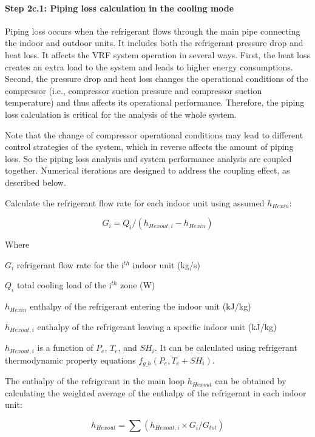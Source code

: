 \paragraph{Step 2c.1: Piping loss calculation in the cooling mode}\label{step-2c.1-piping-loss-calculation-in-the-cooling-mode}

Piping loss occurs when the refrigerant flows through the main pipe connecting the indoor and outdoor units. It includes both the refrigerant pressure drop and heat loss. It affects the VRF system operation in several ways. First, the heat loss creates an extra load to the system and leads to higher energy consumptions. Second, the pressure drop and heat loss changes the operational conditions of the compressor (i.e., compressor suction pressure and compressor suction temperature) and thus affects its operational performance. Therefore, the piping loss calculation is critical for the analysis of the whole system.

Note that the change of compressor operational conditions may lead to different control strategies of the system, which in reverse affects the amount of piping loss. So the piping loss analysis and system performance analysis are coupled together. Numerical iterations are designed to address the coupling effect, as described below.

Calculate the refrigerant flow rate for each indoor unit using assumed $h_{Hexin}$:

\begin{equation}
  G_i=Q_i/(h_{Hexout,i}-h_{Hexin})
\end{equation}

Where

$G_i$ refrigerant flow rate for the i\(^{th}\) indoor unit (kg/s) 

$Q_i$ total cooling load of the i\(^{th}\) zone (W) 

$h_{Hexin}$ enthalpy of the refrigerant entering the indoor unit (kJ/kg)

$h_{Hexout,i}$ enthalpy of the refrigerant leaving a specific indoor unit (kJ/kg)

$h_{Hexout,i}$ is a function of $P_e$, $T_e$, and $SH_i$. It can be calculated using refrigerant thermodynamic property equations $f_{g\_h}(P_e,T_e+SH_i)$.

The enthalpy of the refrigerant in the main loop $h_{Hexout}$ can be obtained by calculating the weighted average of the enthalpy of the refrigerant in each indoor unit:

\begin{equation}
  h_{Hexout}=\sum(h_{Hexout,i}\times{G_i}/{G_{tot}})
\end{equation}

